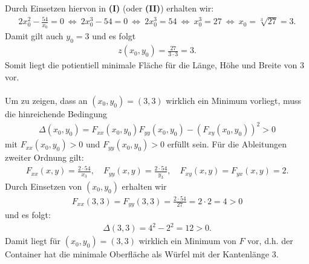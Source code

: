 Durch Einsetzen hiervon in \textbf{(I)} (oder \textbf{(II)}) erhalten wir:
\begin{align*}
	2x_0^2 - \frac{54}{x_0} = 0
	\ \Leftrightarrow \
	2 x_0^3 - 54 = 0
	\ \Leftrightarrow \
	2 x_0^3 = 54 
	\ \Leftrightarrow \
	x_0^3 = 27
	\ \Leftrightarrow \
	x_0 = \sqrt[3]{27} = 3.
\end{align*}
Damit gilt auch $y_0 = 3$ und es folgt 
\begin{align*}
	z(x_0,y_0) = \frac{27}{3 \cdot 3 } = 3.
\end{align*}
Somit liegt die potientiell minimale Fläche für die Länge, Höhe und Breite von $3$ vor.\\
\\
Um zu zeigen, dass an $(x_0,y_0) =(3,3)$ wirklich ein Minimum vorliegt, muss die hinreichende Bedingung
\begin{align*}
	\Delta(x_0,y_0)
	=F_{xx}(x_0,y_0)F_{yy}(x_0,y_0)
	- (F_{xy}(x_0,y_0))^2 > 0 
\end{align*}
mit $F_{xx}(x_0,y_0) > 0 $ und $F_{yy}(x_0,y_0)>0$ erfüllt sein.
Für die Ableitungen zweiter Ordnung gilt:
\begin{align*}
	F_{xx}(x,y)
	=
	\frac{2 \cdot 54}{x_3}, 
	\quad
	F_{yy}(x,y)
	=
	\frac{2 \cdot 54}{y_3},
	\quad
	F_{xy}(x,y)
	=
	F_{yx}(x,y) = 2.
\end{align*}
Durch Einsetzen von $(x_0,y_0)$ erhalten wir
\begin{align*}
	F_{xx}(3,3) = F_{yy}(3,3) = \frac{2 \cdot 54}{27} = 2 \cdot 2 = 4 > 0
\end{align*}
und es folgt:
\begin{align*}
	\Delta(3,3) = 4^2 - 2^2 = 12 > 0.
\end{align*}
Damit liegt für $(x_0,y_0) = (3,3)$ wirklich ein Minimum von $F$ vor, d.h. der Container hat die minimale Oberfläche als Würfel mit der Kantenlänge $3$.

\newpage

